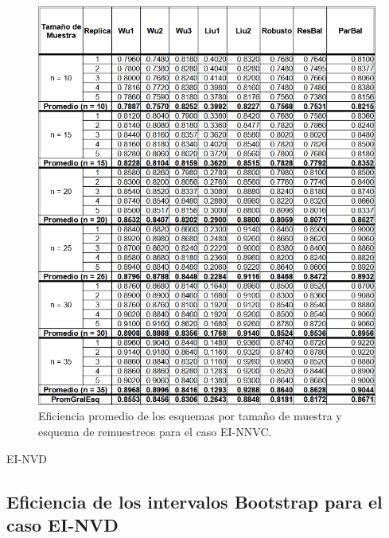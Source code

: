 \begin{figure}[ht] 
	\centering 
	\includegraphics[width=0.9\linewidth]{img/EI_NNVC_Efic_Esq.png} 
	\caption{Eficiencia promedio de los esquemas por tamaño de muestra y esquema de remuestreos para el caso EI-NNVC.} 
	\label{fig:EI_NNVC_Esq}
\end{figure}

EI-NVD
\subsection{Eficiencia de los intervalos Bootstrap para el caso EI-NVD}

